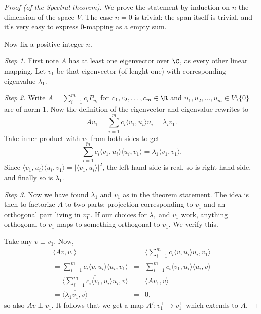 \begin{proof}[Proof (of the Spectral theorem)]
	We prove the statement by induction on $n$ the dimension of the space $V$. The case $n = 0$ is trivial: the span itself is trivial, and it's very easy to express $0$-mapping as a empty sum.

	Now fix a positive integer $n$. 

	\textit{Step 1.} First note $A$ has at least one eigenvector over $\C$, as every other linear mapping. Let $v_{1}$ be that eigenvector (of lenght one) with corresponding eigenvalue $\lambda_{1}$.

	\textit{Step 2.} Write $A = \sum_{i = 1}^{m} c_{i} P_{u_{i}}$ for $c_{1}, c_{2}, \ldots, c_{m} \in \R$ and $u_{1}, u_{2}, \ldots, u_{m} \in V \setminus \{0\}$ are of norm $1$. Now the definition of the eigenvector and eigenvalue rewrites to
	\[
		A v_{1} = \sum_{i = 1}^{m} c_{i} \langle v_{1}, u_{i}\rangle u_{i} = \lambda_{i} v_{1}.
	\]
	Take inner product with $v_{1}$ from both sides to get
	\[
		\sum_{i = 1}^{m} c_{i} \langle v_{1}, u_{i}\rangle \langle u_{i}, v_{1} \rangle = \lambda_{1} \langle v_{1}, v_{1} \rangle.
	\]
	Since $\langle v_{1}, u_{i}\rangle \langle u_{i}, v_{1} \rangle = |\langle v_{1}, u_{i}\rangle|^{2}$, the left-hand side is real, so is right-hand side, and finally so is $\lambda_{1}$.

	\textit{Step 3.} Now we have found $\lambda_{1}$ and $v_{1}$ as in the theorem statement. The idea is then to factorize $A$ to two parts: projection corresponding to $v_{1}$ and an orthogonal part living in $v_{1}^{\perp}$. If our choices for $\lambda_{1}$ and $v_{1}$ work, anything orthogonal to $v_{1}$ maps to something orthogonal to $v_{1}$. We verify this.

	Take any $v \perp v_{1}$. Now,
	\begin{eqnarray*}
		\langle A v, v_{1} \rangle &=& \langle \sum_{i = 1}^{m} c_{i} \langle v, u_{i}\rangle u_{i}, v_{1} \rangle \\
		= \sum_{i = 1}^{m} c_{i} \langle v, u_{i}\rangle \langle u_{i}, v_{1} \rangle &=& \overline{\sum_{i = 1}^{m} c_{i} \langle v_{1}, u_{i}\rangle \langle u_{i}, v \rangle} \\
		= \overline{\langle \sum_{i = 1}^{m} c_{i} \langle v_{1}, u_{i}\rangle u_{i}, v \rangle} &=& \overline{\langle A v_{1}, v \rangle} \\
		= \overline{\langle \lambda_{1} v_{1}, v \rangle} &=& 0,
	\end{eqnarray*}
	so also $A v \perp v_{1}$. It follows that we get a map $A' : v_{1}^{\perp} \to v_{1}^{\perp}$ which extends to $A$.


\end{proof}
